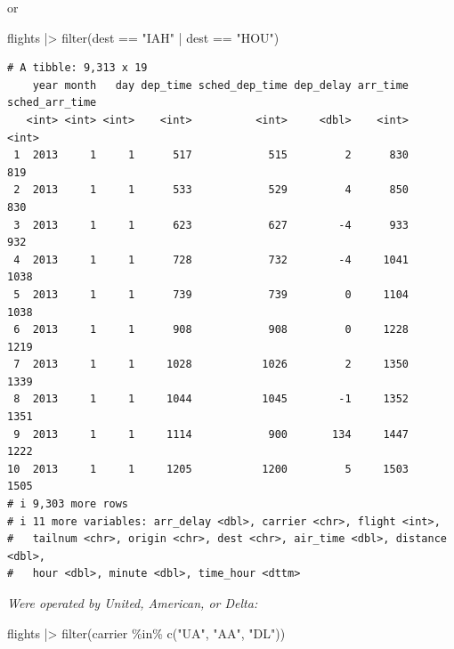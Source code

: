 \documentclass[
  letterpaper,
  DIV=11,
  numbers=noendperiod]{scrreprt}
\newenvironment{Shaded}{\begin{snugshade}}{\end{snugshade}}
\newcommand{\FunctionTok}[1]{\textcolor[rgb]{0.28,0.35,0.67}{#1}}
\newcommand{\NormalTok}[1]{\textcolor[rgb]{0.00,0.23,0.31}{#1}}
\newcommand{\SpecialCharTok}[1]{\textcolor[rgb]{0.37,0.37,0.37}{#1}}
\newcommand{\StringTok}[1]{\textcolor[rgb]{0.13,0.47,0.30}{#1}}
\begin{document}
or

\begin{Shaded}
\begin{Highlighting}[]
\NormalTok{flights }\SpecialCharTok{|\textgreater{}}
  \FunctionTok{filter}\NormalTok{(dest }\SpecialCharTok{==} \StringTok{"IAH"} \SpecialCharTok{|}\NormalTok{ dest }\SpecialCharTok{==} \StringTok{"HOU"}\NormalTok{)}
\end{Highlighting}
\end{Shaded}

\begin{verbatim}
# A tibble: 9,313 x 19
    year month   day dep_time sched_dep_time dep_delay arr_time sched_arr_time
   <int> <int> <int>    <int>          <int>     <dbl>    <int>          <int>
 1  2013     1     1      517            515         2      830            819
 2  2013     1     1      533            529         4      850            830
 3  2013     1     1      623            627        -4      933            932
 4  2013     1     1      728            732        -4     1041           1038
 5  2013     1     1      739            739         0     1104           1038
 6  2013     1     1      908            908         0     1228           1219
 7  2013     1     1     1028           1026         2     1350           1339
 8  2013     1     1     1044           1045        -1     1352           1351
 9  2013     1     1     1114            900       134     1447           1222
10  2013     1     1     1205           1200         5     1503           1505
# i 9,303 more rows
# i 11 more variables: arr_delay <dbl>, carrier <chr>, flight <int>,
#   tailnum <chr>, origin <chr>, dest <chr>, air_time <dbl>, distance <dbl>,
#   hour <dbl>, minute <dbl>, time_hour <dttm>
\end{verbatim}

\emph{Were operated by United, American, or Delta:}

\begin{Shaded}
\begin{Highlighting}[]
\NormalTok{flights }\SpecialCharTok{|\textgreater{}}
  \FunctionTok{filter}\NormalTok{(carrier }\SpecialCharTok{\%in\%} \FunctionTok{c}\NormalTok{(}\StringTok{"UA"}\NormalTok{, }\StringTok{"AA"}\NormalTok{, }\StringTok{"DL"}\NormalTok{))}
\end{Highlighting}
\end{Shaded}
\end{document}
